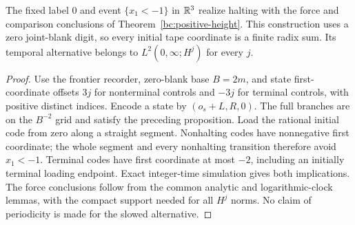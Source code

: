 \begin{theorem}\label{bc:zero-blank}
The fixed label $0$ and event $\{x_1<-1\}$ in $\mathbb R^3$ realize halting
with the force and comparison conclusions of Theorem~\ref{bc:positive-height}.
This construction uses a zero joint-blank digit, so every initial tape
coordinate is a finite radix sum. Its temporal alternative belongs to
$L^2(0,\infty;H^j)$ for every $j$.
\end{theorem}
\begin{proof}\label{bc:zero-blank-proof}
Use the frontier recorder, zero-blank base $B=2m$, and state first-coordinate
offsets $3j$ for nonterminal controls and $-3j$ for terminal controls,
with positive distinct indices. Encode a state by $(o_s+L,R,0)$.
The full branches are on the $B^{-2}$ grid and satisfy the preceding
proposition. Load the rational initial code from zero along a straight
segment. Nonhalting codes have nonnegative first coordinate; the whole
segment and every nonhalting transition therefore avoid $x_1<-1$.
Terminal codes have first coordinate at most $-2$, including an initially
terminal loading endpoint. Exact integer-time simulation gives both
implications. The force conclusions follow from the common analytic and
logarithmic-clock lemmas, with the compact support needed for all $H^j$
norms. No claim of periodicity is made for the slowed alternative.
\end{proof}

